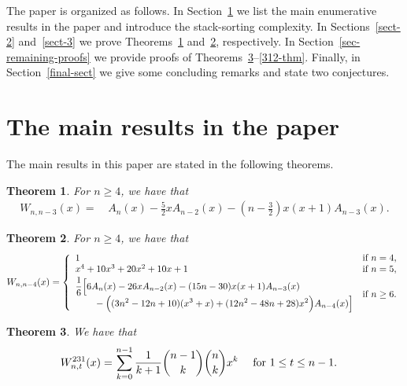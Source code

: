 \documentclass[11pt]{article}
\newtheorem{thm}{Theorem}
\newcommand{\+}{\mbox{\ensuremath{\scriptstyle{+}}}}
\begin{document}
The paper is organized as follows. In Section~\ref{main-results-sec} we list the main enumerative results in the paper and introduce the stack-sorting complexity. In Sections~\ref{sect-2} and~\ref{sect-3}  we prove Theorems~\ref{main-thm1} and~\ref{main-thm2}, respectively. In Section~\ref{sec-remaining-proofs} we provide proofs of Theorems~\ref{231-thm}--\ref{312-thm}. Finally, in Section~\ref{final-sect} we give some concluding remarks and state two conjectures.

\section{The main results in the paper}\label{main-results-sec}

The main results in this paper are stated in the following theorems.
\begin{thm}\label{main-thm1}
	For $n\ge 4$, we have that
	\begin{align} \label{main-eq1}
		W_{n,n-3}(x)= & \,  A_n(x) - \frac{5}{2} x A_{n-2}(x)- \left( n-\frac{3}{2}\right) x(x+1)A_{n-3}(x).
	\end{align}
\end{thm}

\begin{thm}\label{main-thm2}
	For $n\ge 4$, we have that
	\begin{align}
		W_{n,n-4}(x) =
		\left\{\begin{array}{ll}
			1 & \mbox{if } n=4,\\
			x^4+10x^3+20x^2+10x+1 & \mbox{if } n=5,\\[2pt]
			{\begin{aligned}
			&\frac{1}{6}\Big[6A_n(x)-26xA_{n-2}(x)
			-(15n-30)x(x+1)A_{n-3}(x)\\
			&\qquad-\Big((3n^2-12n+10)(x^3+x)
			+(12n^2-48n+28)x^2\Big)A_{n-4}(x)\Big]
			\end{aligned}} & \mbox{if } n\geq6.
		\end{array}\right. \notag
	\end{align}
\end{thm}

\begin{thm}\label{231-thm}
	We have that
	\begin{align}
		W^{231}_{n,t}(x) = &
		\,  \displaystyle\sum_{k= 0}^{n-1}\frac{1}{k+1}{n-1\choose k}{n\choose k}x^k \quad \mbox{ for } 1 \le t\le n-1.	\notag
	\end{align}
\end{thm}
\end{document}
